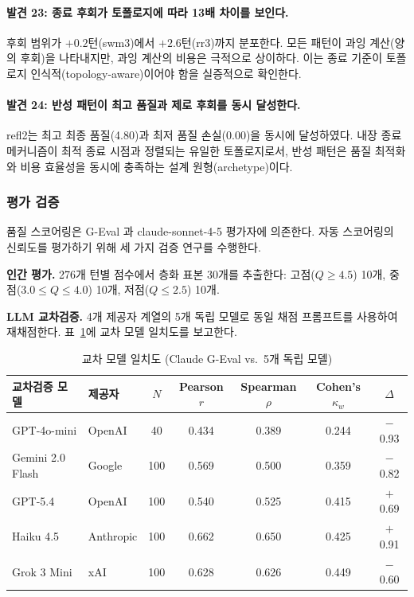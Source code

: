\paragraph{발견 23: 종료 후회가 토폴로지에 따라 13배 차이를 보인다.}
후회 범위가 $+0.2$턴(swm3)에서 $+2.6$턴(rr3)까지 분포한다. 모든 패턴이 과잉 계산(양의 후회)을 나타내지만, 과잉 계산의 비용은 극적으로 상이하다. 이는 종료 기준이 토폴로지 인식적(topology-aware)이어야 함을 실증적으로 확인한다.

\paragraph{발견 24: 반성 패턴이 최고 품질과 제로 후회를 동시 달성한다.}
refl2는 최고 최종 품질(4.80)과 최저 품질 손실(0.00)을 동시에 달성하였다. 내장 종료 메커니즘이 최적 종료 시점과 정렬되는 유일한 토폴로지로서, 반성 패턴은 품질 최적화와 비용 효율성을 동시에 충족하는 설계 원형(archetype)이다.

\subsubsection{평가 검증}

품질 스코어링은 G-Eval \citep{liu2023geval}과 claude-sonnet-4-5 평가자에 의존한다. 자동 스코어링의 신뢰도를 평가하기 위해 세 가지 검증 연구를 수행한다.

\textbf{인간 평가.} 276개 턴별 점수에서 층화 표본 30개를 추출한다: 고점($Q \geq 4.5$) 10개, 중점($3.0 \leq Q \leq 4.0$) 10개, 저점($Q \leq 2.5$) 10개.

\textbf{LLM 교차검증.} 4개 제공자 계열의 5개 독립 모델로 동일 채점 프롬프트를 사용하여 재채점한다. 표~\ref{tab:cross-model-agreement}에 교차 모델 일치도를 보고한다.

\begin{table}[H]
\centering
\caption{교차 모델 일치도 (Claude G-Eval vs.\ 5개 독립 모델)}
\label{tab:cross-model-agreement}
{\small
\begin{tabular}{llccccc}
\toprule
교차검증 모델 & 제공자 & $N$ & Pearson $r$ & Spearman $\rho$ & Cohen's $\kappa_w$ & $\Delta$ \\
\midrule
GPT-4o-mini      & OpenAI    & 40  & 0.434 & 0.389 & 0.244 & $-$0.93 \\
Gemini 2.0 Flash & Google    & 100 & 0.569 & 0.500 & 0.359 & $-$0.82 \\
GPT-5.4          & OpenAI    & 100 & 0.540 & 0.525 & 0.415 & $+$0.69 \\
Haiku 4.5        & Anthropic & 100 & 0.662 & 0.650 & 0.425 & $+$0.91 \\
Grok 3 Mini      & xAI       & 100 & 0.628 & 0.626 & 0.449 & $-$0.60 \\
\bottomrule
\end{tabular}
}
\end{table}

